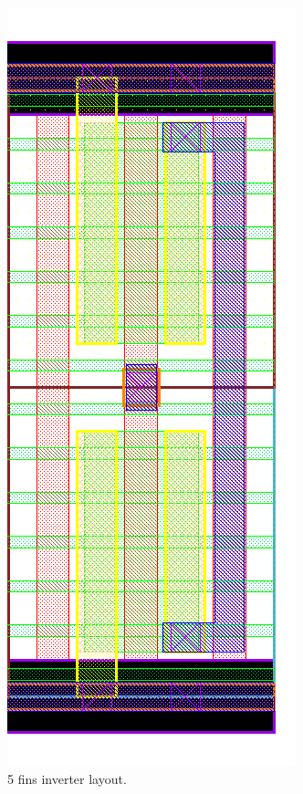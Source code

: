 \documentclass[pgmicro,mestrado,english]{iiufrgs}
\begin{document}
\begin{figure}[]
\centering
\includegraphics[width=\textwidth,height=\textheight,keepaspectratio]{INV5F.png}
\caption{5 fins inverter layout.}
\label{fig:INV5F}
\end{figure}
\end{document}
